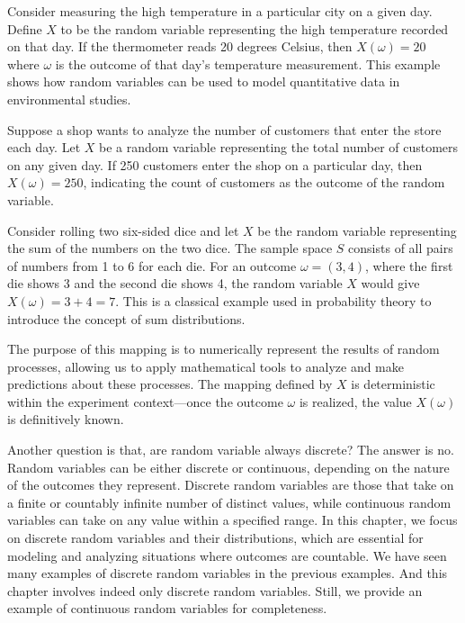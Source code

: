     \begin{example}
    Consider measuring the high temperature in a particular city on a given day. 
    Define \( X \) to be the random variable representing the high temperature 
    recorded on that day. If the thermometer reads 20 degrees Celsius, then 
    \( X(\omega) = 20 \) where \( \omega \) is the outcome of that day's temperature 
    measurement. This example shows how random variables can be used to model 
    quantitative data in environmental studies.
    \end{example}
    
    \begin{example}
    Suppose a shop wants to analyze the number of customers that enter the store 
    each day. Let \( X \) be a random variable representing the total number of 
    customers on any given day. If 250 customers enter the shop on a particular day, 
    then \( X(\omega) = 250 \), indicating the count of customers as the outcome 
    of the random variable.
    \end{example}
    
    \begin{example}
    Consider rolling two six-sided dice and let \( X \) be the random variable 
    representing the sum of the numbers on the two dice. The sample space \( S \) 
    consists of all pairs of numbers from 1 to 6 for each die. For an outcome 
    \( \omega = (3, 4) \), where the first die shows 3 and the second die shows 4, 
    the random variable \( X \) would give \( X(\omega) = 3 + 4 = 7 \). This is a 
    classical example used in probability theory to introduce the concept of sum 
    distributions.
    \end{example}

The purpose of this mapping is to numerically represent the results of 
random processes, allowing us to apply mathematical tools to analyze 
and make predictions about these processes. The mapping defined by \( X \) 
is deterministic within the experiment context—once the outcome \( \omega \) 
is realized, the value \( X(\omega) \) is definitively known. 

Another question is that, are random variable always discrete? The answer is no. Random variables can be either discrete or continuous, depending on the nature of the outcomes they represent. Discrete random variables are those that take on a finite or countably infinite number of distinct values, while continuous random variables can take on any value within a specified range. In this chapter, we focus on discrete random variables and their distributions, 
which are essential for modeling and analyzing situations where outcomes are countable.
We have seen many examples of discrete random variables in the previous examples. 
And this chapter involves indeed only discrete random variables. Still, we provide an example of continuous random variables for completeness.

